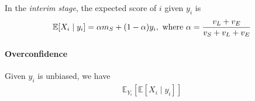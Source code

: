 \documentclass[11pt]{elegantbook}
\begin{document}
In the \textit{interim stage}, the expected score of $i$ given $y_i$ is
\begin{equation}
    \begin{aligned}
        \mathbb{E}[X_i\mid y_i]=\alpha m_S +(1-\alpha)y_i, \textnormal{ where }\alpha=\frac{v_L+v_E}{v_S+v_L+v_E}
    \end{aligned}
    \nonumber
\end{equation}
\paragraph*{Overconfidence} Given $y_i$ is unbiased, we have
\begin{equation}
    \begin{aligned}
        \mathbb{E}_{Y_i}[\mathbb{E}[X_i\mid y_i]]
    \end{aligned}
    \nonumber
\end{equation}













































\end{document}
